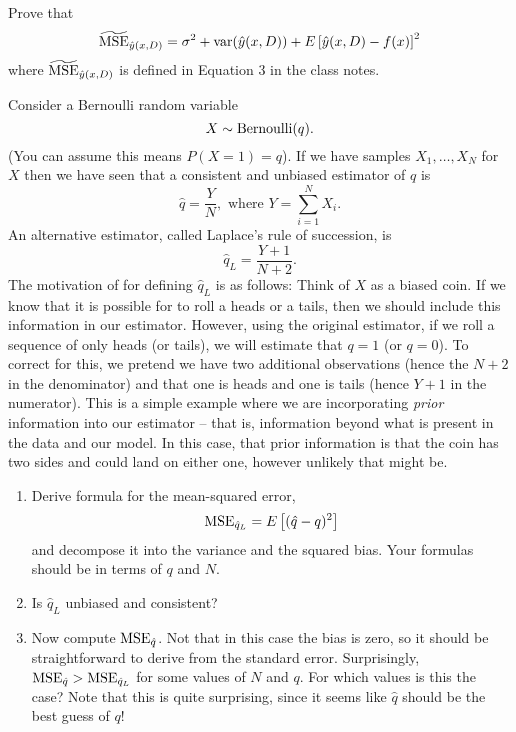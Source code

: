 \begin{exercise}
Prove that 
\begin{equation*}
\widetilde{{\rm MSE}}_{\hat{y}(x,D)} = \sigma^2 +{\rm var}(\hat{y}(x,D)) + E\left[\hat{y}(x,D)-f(x)\right]^2
\end{equation*}
where $\widetilde{{\rm MSE}}_{\hat{y}(x,D)}$ is defined in Equation 3 in the class notes. 
\end{exercise}
\begin{exercise}
Consider a Bernoulli random variable 
\begin{equation*}
X \sim {\rm Bernoulli}(q).
\end{equation*}
(You can assume this means $P(X=1)=q$). 
If we have samples $X_1,\dots,X_N$ for $X$ then we have seen that a consistent and unbiased estimator of $q$ is 
\begin{equation*}
\hat{q} = \frac{Y}{N}, \text{ where }Y = \sum_{i=1}^NX_i.
\end{equation*}
An alternative estimator, called Laplace's rule of succession, is 
\begin{equation*}
\hat{q}_L = \frac{Y+1}{N+2}.
\end{equation*}
The motivation of for defining $\hat{q}_L$ is as follows: Think of $X$ as a biased coin. If we know that it is possible for to roll a heads or a tails, then we should include this information in our estimator. However, using the original estimator, if we roll a sequence of only heads (or tails), we will estimate that $q=1$ (or $q=0$). To correct for this, we pretend we have two additional observations (hence the $N+2$ in the denominator) and that one is heads and one is tails (hence $Y+1$ in the numerator). This is a simple example where we are incorporating \emph{prior} information  into our estimator -- that is, information beyond what is present in the data and our model. In this case, that prior information is that the coin has two sides and could land on either one, however unlikely that might be. 

\begin{enumerate}[label=(\alph*)]
\item Derive formula for the mean-squared error,
\begin{equation*}
{\rm MSE}_{\hat{q}_L} = E\left[(\hat{q}-q)^2 \right]
\end{equation*}
and decompose it into the variance and the squared bias. Your formulas should be in terms of $q$ and $N$.
\item Is $\hat{q}_L$ unbiased and consistent? 
\item Now compute ${\rm MSE}_{\hat{q}}$. Not that in this case the bias is zero, so it should be straightforward to derive from the standard error.  Surprisingly, ${\rm MSE}_{\hat{q}}>{\rm MSE}_{\hat{q}_L}$ for some values of $N$ and $q$. For which values is this the case? Note that this is quite surprising, since it seems like $\hat{q}$ should be the best guess of $q$!  \end{enumerate}



\end{exercise}
